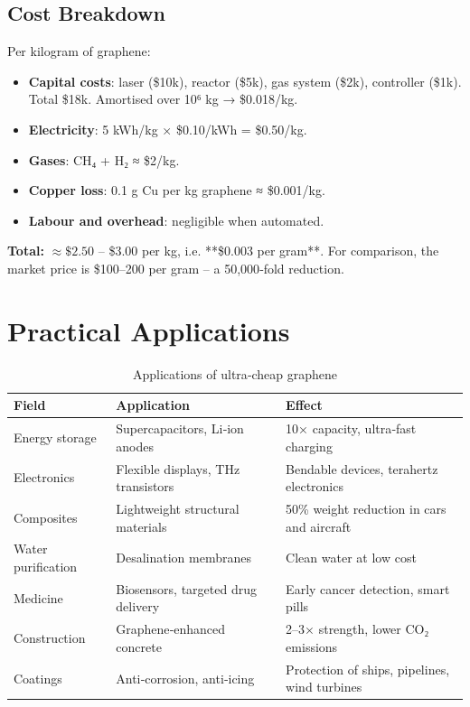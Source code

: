 \documentclass[12pt,a4paper]{article}
\begin{document}
\subsection{Cost Breakdown}

Per kilogram of graphene:

\begin{itemize}
    \item \textbf{Capital costs}: laser (\$10k), reactor (\$5k), gas system (\$2k), controller (\$1k). Total \$18k. Amortised over 10⁶ kg → \$0.018/kg.
    \item \textbf{Electricity}: 5 kWh/kg × \$0.10/kWh = \$0.50/kg.
    \item \textbf{Gases}: CH₄ + H₂ ≈ \$2/kg.
    \item \textbf{Copper loss}: 0.1 g Cu per kg graphene ≈ \$0.001/kg.
    \item \textbf{Labour and overhead}: negligible when automated.
\end{itemize}

\textbf{Total:} \(\approx \$2.50\) – \$3.00 per kg, i.e. **\$0.003 per gram**. For comparison, the market price is \$100–200 per gram – a 50,000‑fold reduction.

\section{Practical Applications}

\begin{table}[h]
\centering
\caption{Applications of ultra‑cheap graphene}
\label{tab:apps}
\begin{tabular}{|p{3cm}|p{5cm}|p{5cm}|}
\hline
Field & Application & Effect \\
\hline
Energy storage & Supercapacitors, Li‑ion anodes & 10× capacity, ultra‑fast charging \\
Electronics & Flexible displays, THz transistors & Bendable devices, terahertz electronics \\
Composites & Lightweight structural materials & 50\% weight reduction in cars and aircraft \\
Water purification & Desalination membranes & Clean water at low cost \\
Medicine & Biosensors, targeted drug delivery & Early cancer detection, smart pills \\
Construction & Graphene‑enhanced concrete & 2–3× strength, lower CO₂ emissions \\
Coatings & Anti‑corrosion, anti‑icing & Protection of ships, pipelines, wind turbines \\
\hline
\end{tabular}
\end{table}
\end{document}
